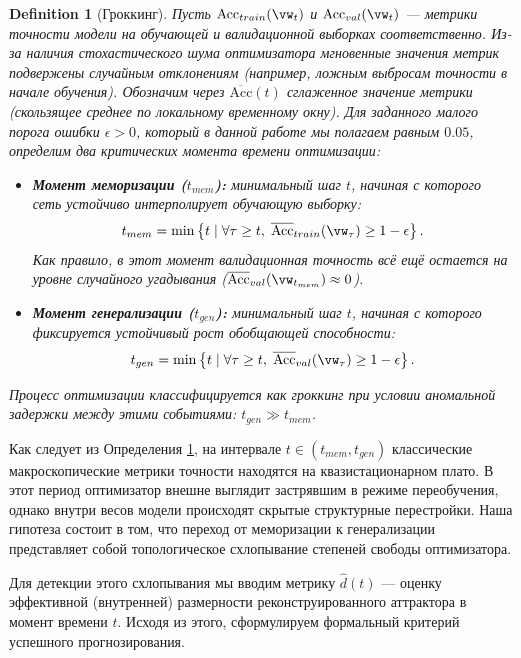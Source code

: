 \documentclass{article}
\newtheorem{definition}{Definition}
\begin{document}
\begin{definition}[Гроккинг]\label{def:grokking}
Пусть $\text{Acc}_{train}(\vw_t)$ и $\text{Acc}_{val}(\vw_t)$ — метрики точности модели на обучающей и валидационной выборках соответственно. Из-за наличия стохастического шума оптимизатора мгновенные значения метрик подвержены случайным отклонениям (например, ложным выбросам точности в начале обучения). Обозначим через $\overline{\text{Acc}}(t)$ сглаженное значение метрики (скользящее среднее по локальному временному окну). Для заданного малого порога ошибки $\epsilon > 0$, который в данной работе мы полагаем равным $0.05$, определим два критических момента времени оптимизации:
\begin{itemize}
    \item \textbf{Момент меморизации ($t_{mem}$):} минимальный шаг $t$, начиная с которого сеть устойчиво интерполирует обучающую выборку: 
    $$ t_{mem} = \min \left\{ t \mid \forall \tau \ge t, \; \overline{\text{Acc}}_{train}(\vw_\tau) \ge 1 - \epsilon \right\}. $$
    Как правило, в этот момент валидационная точность всё ещё остается на уровне случайного угадывания ($\overline{\text{Acc}}_{val}(\vw_{t_{mem}}) \approx 0$).
    
    \item \textbf{Момент генерализации ($t_{gen}$):} минимальный шаг $t$, начиная с которого фиксируется устойчивый рост обобщающей способности:
    $$ t_{gen} = \min \left\{ t \mid \forall \tau \ge t, \; \overline{\text{Acc}}_{val}(\vw_\tau) \ge 1 - \epsilon \right\}. $$
\end{itemize}
Процесс оптимизации классифицируется как гроккинг при условии аномальной задержки между этими событиями: $t_{gen} \gg t_{mem}$.
\end{definition}



Как следует из Определения \ref{def:grokking}, на интервале $t \in (t_{mem}, t_{gen})$ классические макроскопические метрики точности находятся на квазистационарном плато. В этот период оптимизатор внешне выглядит застрявшим в режиме переобучения, однако внутри весов модели происходят скрытые структурные перестройки. Наша гипотеза состоит в том, что переход от меморизации к генерализации представляет собой топологическое схлопывание степеней свободы оптимизатора.

Для детекции этого схлопывания мы вводим метрику $\hat{d}(t)$ — оценку эффективной (внутренней) размерности реконструированного аттрактора в момент времени $t$. Исходя из этого, сформулируем формальный критерий успешного прогнозирования.
\end{document}
